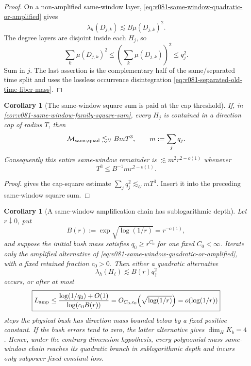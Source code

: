 \documentclass[10pt]{article}
\newtheorem{corollary}[theorem]{Corollary}
\begin{document}
\begin{proof}
On a non-amplified same-window layer,
\eqref{eq:v081-same-window-quadratic-or-amplified} gives
\[
\lambda_h(D_{j,k})
\lesssim
B\mu(D_{j,k})^2.
\]
The degree layers are disjoint inside each \(H_j\), so
\[
\sum_k\mu(D_{j,k})^2
\le
\left(\sum_k\mu(D_{j,k})\right)^2
\le q_j^2.
\]
Sum in \(j\).  The last assertion is the complementary half of the same/separated time split and
uses the lossless occurrence disintegration
\eqref{eq:v081-separated-old-time-fiber-mass}.
\end{proof}

\begin{corollary}[The same-window square sum is paid at the cap threshold]
\label{cor:v081-same-window-cap-square-payment}
If, in \cref{cor:v081-same-window-family-square-sum}, every \(H_j\) is contained in a direction cap
of radius \(T\), then
\[
\mathcal M_{\rm same,quad}
\lesssim_U
BmT^3,
\qquad
m:=\sum_jq_j.
\]
Consequently this entire same-window remainder is
\(\lesssim m^2r^{2-o(1)}\) whenever
\[
T^3\le B^{-1}mr^{2-o(1)}.
\]
\end{corollary}

\begin{proof}
 gives the cap-square estimate
\(\sum_jq_j^2\lesssim_UmT^3\).  Insert it into the preceding same-window square sum.
\end{proof}

\begin{corollary}[A same-window amplification chain has sublogarithmic depth]
\label{cor:v081-same-window-amplification-depth}
Let \(r\downarrow0\), put
\[
B(r):=\exp\!\sqrt{\log(1/r)}=r^{-o(1)},
\]
and suppose the initial bush mass satisfies \(q_0\ge r^{C_0}\) for one fixed \(C_0<\infty\).
Iterate only the amplified alternative of
\eqref{eq:v081-same-window-quadratic-or-amplified}, with a fixed retained fraction
\(c_0>0\).  Then either a quadratic alternative
\[
\lambda_h(H_\ell)\lesssim B(r)q_\ell^2
\]
occurs, or after at most
\begin{equation}
\label{eq:v081-same-window-amplification-depth}
\boxed{
L_{\rm amp}
\le
\frac{\log(1/q_0)+O(1)}
{\log(c_0B(r))}
=
O_{C_0,c_0}\!\left(\sqrt{\log(1/r)}\right)
=
o(\log(1/r))
}
\end{equation}
steps the physical bush has direction mass bounded below by a fixed positive constant.
If the bush errors tend to zero, the latter alternative gives
\(\dim_HK_b=4\).  Hence, under the contrary dimension hypothesis, every polynomial-mass
same-window chain reaches its quadratic branch in sublogarithmic depth and incurs only subpower
fixed-constant loss.
\end{corollary}
\end{document}
